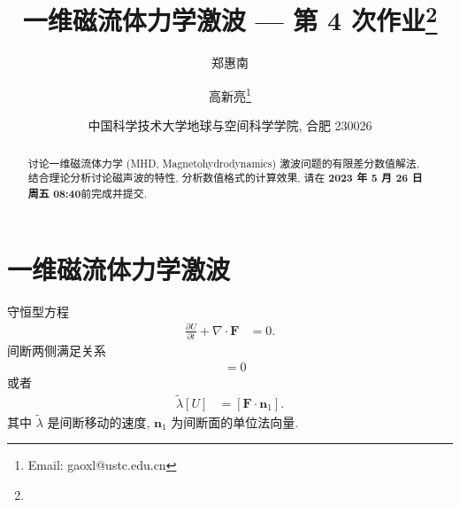 \documentclass[10.5pt
]{article}
\title{一维磁流体力学激波 --- 第 4 次作业\footnote{\Term\Course}}
\author{
  郑惠南
  \and
  高新亮\footnote{Email: gaoxl@ustc.edu.cn}
}
\date{%
\scriptsize%
中国科学技术大学地球与空间科学学院, 合肥 230026
%
}
\def\due{2023 年 5 月 26 日周五 08:40}
\begin{document}
\maketitle

\begin{abstract}
讨论一维磁流体力学 (MHD, Magnetohydrodynamics) 激波问题的有限差分数值解法, 结合理论分析讨论磁声波的特性,
分析数值格式的计算效果, 请在 \textbf{\due}前完成并提交.
\end{abstract}

\section{一维磁流体力学激波\citep{Jeffrey1964}}
守恒型方程
\begin{align}
\frac{\partial U}{\partial t} + \nabla \cdot \boldsymbol{F} &= 0. \label{Eqn:3.1.6}
\end{align}
间断两侧满足关系
\begin{align}
[\tilde{\lambda} U - \boldsymbol{F} \cdot \boldsymbol{n}_1] &= 0 \label{Eqn:3.1.11}
\end{align}
或者
\begin{align}
\tilde{\lambda} [U] &= [\boldsymbol{F} \cdot \boldsymbol{n}_1]. \label{Eqn:3.1.11a}
\end{align}
其中 $\tilde{\lambda}$ 是间断移动的速度, $\boldsymbol{n}_1$ 为间断面的单位法向量.
\end{document}
